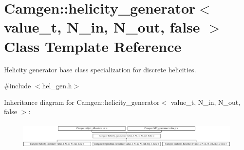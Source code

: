 \hypertarget{a00271}{}\section{Camgen\+:\+:helicity\+\_\+generator$<$ value\+\_\+t, N\+\_\+in, N\+\_\+out, false $>$ Class Template Reference}
\label{a00271}


Helicity generator base class specialization for discrete helicities.  




{\ttfamily \#include $<$hel\+\_\+gen.\+h$>$}

Inheritance diagram for Camgen\+:\+:helicity\+\_\+generator$<$ value\+\_\+t, N\+\_\+in, N\+\_\+out, false $>$\+:\begin{figure}[H]
\begin{center}
\leavevmode
\includegraphics[height=1.372549cm]{a00271}
\end{center}
\end{figure}
